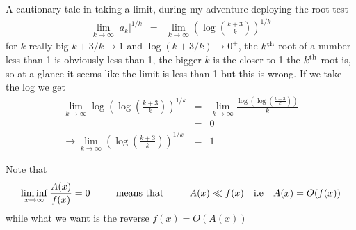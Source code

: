 \documentclass[aps,preprint,preprintnumbers,nofootinbib,showpacs,prd]{revtex4-1}
\newcommand{\nbea}{\begin{eqnarray*}}
\newcommand{\neea}{\end{eqnarray*}}
\begin{document}
A cautionary tale in taking a limit, during my adventure deploying the root test
%
\nbea
\lim_{k\to\infty} \left|a_k\right|^{1/k} & = & \lim_{k\to\infty} \left(\log\left(\frac{k+3}{k}\right)\right)^{1/k}
\neea 
%
for $k$ really big $k+3/k \to 1$ and $\log(k+3/k) \to 0^{+}$, the $k^{\rm th}$ root of a number less than 1 is obviously less than 1, the bigger $k$ is the closer to 1 the $k^{\rm th}$ root is, so at a glance it seems like the limit is less than 1 but this is wrong. If we take the log we get
%
\nbea
\lim_{k\to\infty} \log\left(\log\left(\frac{k+3}{k}\right)\right)^{1/k} & = & \lim_{k\to\infty} \frac{\log\left(\log\left(\frac{k+3}{k}\right)\right)}{k} \\
& = & 0 \\
\to \lim_{k\to\infty} \left(\log\left(\frac{k+3}{k}\right)\right)^{1/k} & = & 1
\neea
%

Note that
%
\nbea
\liminf_{x\to\infty} \frac{A(x)}{f(x)} = 0 ~~~~~~~~ {\rm means~that} ~~~~~~~~ A(x) \ll f(x) ~~~{\rm i.e} ~~~ A(x) = O(f(x))
\neea
%
while what we want is the reverse $f(x) = O(A(x))$
\end{document}
